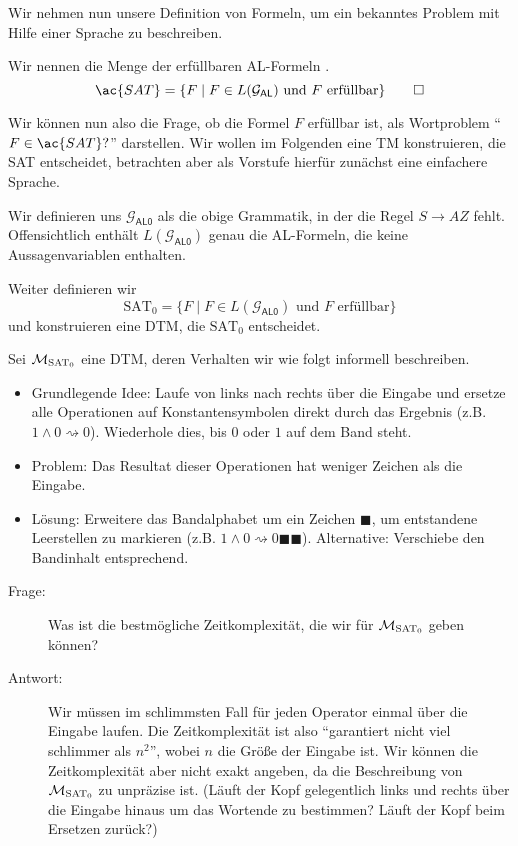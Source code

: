 Wir nehmen nun unsere Definition von Formeln, um ein bekanntes Problem mit Hilfe einer Sprache zu beschreiben.
\begin{Def}
Wir nennen die Menge der erfüllbaren \ac{AL}-Formeln .
\[ \ac{SAT}=\{F\mid F\in L(\mathcal{G}_\mathsf{AL}) \text{ und $F$ erfüllbar}\}\qedhere \]
\end{Def}


Wir können nun also die Frage, ob die Formel $F$ erfüllbar ist, als Wortproblem "`$F\in\ac{SAT}?$"' darstellen.
Wir wollen im Folgenden eine \ac{TM} konstruieren, die \ac{SAT} entscheidet, betrachten aber als Vorstufe hierfür zunächst eine einfachere Sprache.


Wir definieren uns $\mathcal{G}_\mathsf{AL0}$ als die obige Grammatik, in der die Regel $S\to AZ$ fehlt.
Offensichtlich enthält $L(\mathcal{G}_\mathsf{AL0})$ genau die \ac{AL}-Formeln, die keine Aussagenvariablen enthalten.

Weiter definieren wir 
$$\text{SAT}_0=\{F\mid F\in L(\mathcal{G}_\mathsf{AL0}) \text{ und $F$ erfüllbar}\}$$
und konstruieren eine \ac{DTM}, die $\text{SAT}_0$ entscheidet.

\begin{Bsp}\label{bsp:DtmSat0}
Sei $\mathcal{M}_{\text{SAT}_0}$ eine \ac{DTM}, deren Verhalten wir wie folgt informell beschreiben.
\begin{itemize}
 \item Grundlegende Idee: Laufe von links nach rechts über die Eingabe und ersetze alle Operationen auf Konstantensymbolen direkt durch das Ergebnis (z.B. $1\land 0\rightsquigarrow 0$).
 Wiederhole dies, bis $0$ oder $1$ auf dem Band steht.
 \item Problem: Das Resultat dieser Operationen hat weniger Zeichen als die Eingabe.
 \item Lösung: Erweitere das Bandalphabet um ein Zeichen $\blacksquare$, um entstandene Leerstellen zu markieren (z.B. $1\land 0\rightsquigarrow 0\blacksquare\blacksquare$). Alternative: Verschiebe den Bandinhalt entsprechend.
 \qedhere
\end{itemize}
\end{Bsp}

\begin{description}
\item[Frage:] Was ist die bestmögliche Zeitkomplexität, die wir für $\mathcal{M}_{\text{SAT}_0}$ geben können?

\item[Antwort:] Wir müssen im schlimmsten Fall für jeden Operator einmal über die Eingabe laufen.
Die Zeitkomplexität ist also "`garantiert nicht viel schlimmer als $n^2$"', wobei $n$ die Größe der Eingabe ist.
Wir können die Zeitkomplexität aber nicht exakt angeben, da die Beschreibung von $\mathcal{M}_{\text{SAT}_0}$ zu unpräzise ist.
(Läuft der Kopf gelegentlich links und rechts über die Eingabe hinaus um das Wortende zu bestimmen?
Läuft der Kopf beim Ersetzen zurück?)
\end{description}

